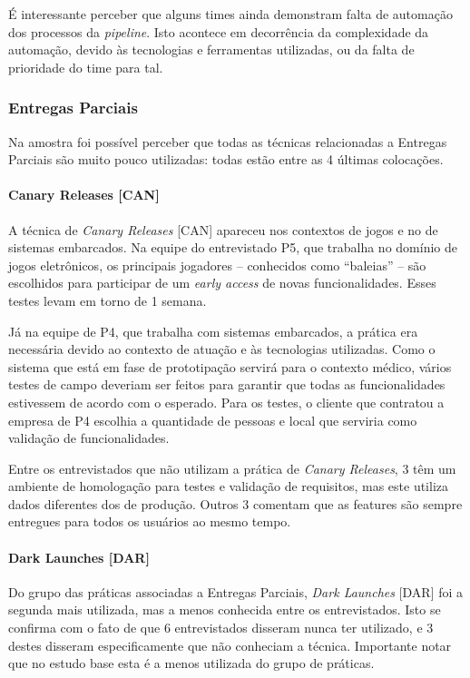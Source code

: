 É interessante perceber que alguns times ainda demonstram falta de automação dos processos da \emph{pipeline}. Isto acontece em decorrência da complexidade da automação, devido às tecnologias e ferramentas utilizadas, ou da falta de prioridade do time para tal.
 
\subsubsection{Entregas Parciais}

Na amostra foi possível perceber que todas as técnicas relacionadas a Entregas Parciais são muito pouco utilizadas: todas estão entre as 4 últimas colocações.

\paragraph{Canary Releases [CAN]}

A técnica de \emph{Canary Releases} [CAN] \cite{continuousDeliveryBook} apareceu nos contextos de jogos e no de sistemas embarcados. Na equipe do entrevistado P5, que trabalha no domínio de jogos eletrônicos, os principais jogadores -- conhecidos como ``baleias'' -- são escolhidos para participar de um \emph{early access} de novas funcionalidades.  Esses testes levam em torno de 1 semana. 

Já na equipe de P4, que trabalha com sistemas embarcados, a prática era necessária devido ao contexto de atuação e às tecnologias utilizadas. Como o sistema que está em fase de prototipação servirá para o contexto médico, vários testes de campo deveriam ser feitos para garantir que todas as funcionalidades estivessem de acordo com o esperado. Para os testes, o cliente que contratou a empresa de P4 escolhia a quantidade de pessoas e local que serviria como validação de funcionalidades.

Entre os entrevistados que não utilizam a prática de \emph{Canary Releases}, 3 têm um ambiente de homologação para testes e validação de requisitos, mas este utiliza dados diferentes dos de produção. Outros 3 comentam que as features são sempre entregues para todos os usuários ao mesmo tempo.


\paragraph{Dark Launches [DAR]}

Do grupo das práticas associadas a Entregas Parciais, \emph{Dark Launches} [DAR] \cite{devAndDeploymentFB} foi a segunda mais utilizada, mas a menos conhecida entre os entrevistados. Isto se confirma com o fato de que 6 entrevistados disseram nunca ter utilizado, e 3 destes disseram especificamente que não conheciam a técnica. Importante notar que no estudo base \cite{empiricalStudy2016} esta é a menos utilizada do grupo de práticas.


